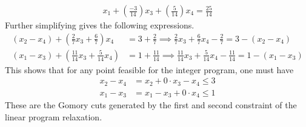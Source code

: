 \begin{enumerate}
\begin{enumerate}[label=(\arabic*)]
\begin{align*}
                        x_1 + \left(\frac{-3}{14}\right)x_3 + \left(\frac{5}{14}\right)x_4 = \frac{25}{14}
                    \end{align*}
                    Further simplifying gives the following expressions.
                    \begin{align*}
                        (x_2 - x_4) + \left(\frac{2}{7}x_3 + \frac{6}{7}\right)x_4    & = 3 + \frac{2}{7}   \implies \frac{2}{7}x_3 + \frac{6}{7}x_4 - \frac{2}{7} = 3 - (x_2 - x_4)      \\
                        (x_1 - x_3) + \left(\frac{11}{14}x_3 + \frac{5}{14}x_4\right) & = 1 + \frac{11}{14} \implies \frac{11}{14}x_3 + \frac{5}{14}x_4 - \frac{11}{14} = 1 - (x_1 - x_3)
                    \end{align*}
                    This shows that for any point feasible for the integer program, one must have
                    \begin{align*}
                        x_2 - x_4 & = x_2 + 0 \cdot x_3 - x_4 \leq 3 \\
                        x_1 - x_3 & = x_1 - x_3 + 0 \cdot x_4 \leq 1
                    \end{align*}
                    These are the Gomory cuts generated by the first and second constraint of the linear program relaxation.
          \end{enumerate}

\end{enumerate}